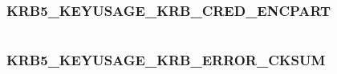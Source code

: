 \documentclass[letterpaper,10pt,english]{sphinxmanual}
\begin{document}
\begin{fulllineitems}
\label{appdev/refs/macros/KRB5_KEYUSAGE_KDC_REP_TICKET:KRB5_KEYUSAGE_KDC_REP_TICKET}
\end{fulllineitems}


\begin{tabulary}{\linewidth}{|L|L|}
\hline

 & 
\\
\hline\end{tabulary}



\subsubsection{KRB5\_KEYUSAGE\_KRB\_CRED\_ENCPART}
\label{appdev/refs/macros/KRB5_KEYUSAGE_KRB_CRED_ENCPART:krb5-keyusage-krb-cred-encpart-data}\label{appdev/refs/macros/KRB5_KEYUSAGE_KRB_CRED_ENCPART::doc}\label{appdev/refs/macros/KRB5_KEYUSAGE_KRB_CRED_ENCPART:krb5-keyusage-krb-cred-encpart}

\begin{fulllineitems}
\label{appdev/refs/macros/KRB5_KEYUSAGE_KRB_CRED_ENCPART:KRB5_KEYUSAGE_KRB_CRED_ENCPART}
\end{fulllineitems}


\begin{tabulary}{\linewidth}{|L|L|}
\hline

 & 
\\
\hline\end{tabulary}



\subsubsection{KRB5\_KEYUSAGE\_KRB\_ERROR\_CKSUM}
\label{appdev/refs/macros/KRB5_KEYUSAGE_KRB_ERROR_CKSUM:krb5-keyusage-krb-error-cksum-data}\label{appdev/refs/macros/KRB5_KEYUSAGE_KRB_ERROR_CKSUM::doc}\label{appdev/refs/macros/KRB5_KEYUSAGE_KRB_ERROR_CKSUM:krb5-keyusage-krb-error-cksum}

\begin{fulllineitems}
\label{appdev/refs/macros/KRB5_KEYUSAGE_KRB_ERROR_CKSUM:KRB5_KEYUSAGE_KRB_ERROR_CKSUM}
\end{fulllineitems}
\end{document}
